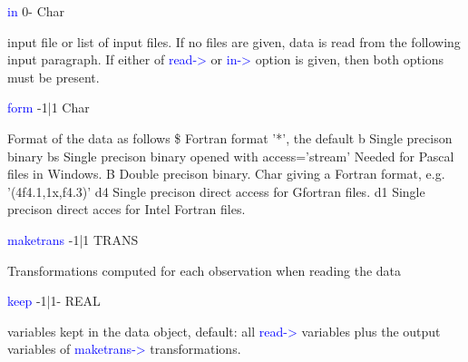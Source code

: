 \vspace{0.3cm}
\hline
\vspace{0.3cm}
\noindent \textcolor{blue}{in}  \tabto{3cm} 0- \tabto{5cm}  Char \tabto{7cm}
\begin{changemargin}{3cm}{0cm}
\noindent input file or list of input files. If no files are given, data is read from the following input
paragraph. If either of \textcolor{blue}{read->} or \textcolor{blue}{in->} option is given, then both options must
be present.
\end{changemargin}
\vspace{0.3cm}
\hline
\vspace{0.3cm}
\noindent \textcolor{blue}{form}  \tabto{3cm} -1|1 \tabto{5cm}  Char \tabto{7cm}
\begin{changemargin}{3cm}{0cm}
\noindent  Format of the data as follows \newline
\$  Fortran format '*', the default \newline
b    Single precison binary \newline
bs  Single precison binary opened with access='stream'
Needed for Pascal files in Windows. \newline
B  Double precison binary.\newline
Char giving a Fortran format, e.g. '(4f4.1,1x,f4.3)' \newline
d4 Single precison direct access for Gfortran files.\newline
d1 Single precison direct acces for Intel Fortran files.
\end{changemargin}
\vspace{0.3cm}
\hline
\vspace{0.3cm}
\noindent \textcolor{blue}{maketrans} \tabto{3cm} -1|1 \tabto{5cm}  TRANS  \tabto{7cm}
\begin{changemargin}{3cm}{0cm}
\noindent Transformations computed for each observation when reading the data


\end{changemargin}
\vspace{0.3cm}
\hline
\vspace{0.3cm}
\noindent \textcolor{blue}{keep} \tabto{3cm} -1|1- \tabto{5cm}  REAL \tabto{7cm}
\begin{changemargin}{3cm}{0cm}
\noindent  variables kept in the data object, default: all \textcolor{blue}{read->} variables plus the output
variables of \textcolor{blue}{maketrans->} transformations.

\end{changemargin}
